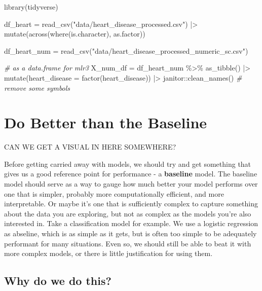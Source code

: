 \documentclass[
  letterpaper,
]{krantz}
\newenvironment{Shaded}{}{}
\newcommand{\AttributeTok}[1]{\textcolor[rgb]{0.49,0.56,0.16}{#1}}
\newcommand{\CommentTok}[1]{\textcolor[rgb]{0.38,0.63,0.69}{\textit{#1}}}
\newcommand{\FunctionTok}[1]{\textcolor[rgb]{0.02,0.16,0.49}{#1}}
\newcommand{\NormalTok}[1]{#1}
\newcommand{\OtherTok}[1]{\textcolor[rgb]{0.00,0.44,0.13}{#1}}
\newcommand{\SpecialCharTok}[1]{\textcolor[rgb]{0.25,0.44,0.63}{#1}}
\newcommand{\StringTok}[1]{\textcolor[rgb]{0.25,0.44,0.63}{#1}}
\begin{document}
\begin{Shaded}
\begin{Highlighting}[]
\FunctionTok{library}\NormalTok{(tidyverse)}

\NormalTok{df\_heart }\OtherTok{=} \FunctionTok{read\_csv}\NormalTok{(}\StringTok{"data/heart\_disease\_processed.csv"}\NormalTok{) }\SpecialCharTok{|\textgreater{}} 
    \FunctionTok{mutate}\NormalTok{(}\FunctionTok{across}\NormalTok{(}\FunctionTok{where}\NormalTok{(is.character), as.factor))}

\NormalTok{df\_heart\_num }\OtherTok{=} \FunctionTok{read\_csv}\NormalTok{(}\StringTok{"data/heart\_disease\_processed\_numeric\_sc.csv"}\NormalTok{)}


\CommentTok{\# as a data.frame for mlr3}
\NormalTok{X\_num\_df }\OtherTok{=}\NormalTok{ df\_heart\_num }\SpecialCharTok{\%\textgreater{}\%}
    \FunctionTok{as\_tibble}\NormalTok{() }\SpecialCharTok{|\textgreater{}} 
    \FunctionTok{mutate}\NormalTok{(}\AttributeTok{heart\_disease =} \FunctionTok{factor}\NormalTok{(heart\_disease)) }\SpecialCharTok{|\textgreater{}} 
\NormalTok{    janitor}\SpecialCharTok{::}\FunctionTok{clean\_names}\NormalTok{() }\CommentTok{\# remove some symbols}
\end{Highlighting}
\end{Shaded}

\section{Do Better than the Baseline}\label{do-better-than-the-baseline}

CAN WE GET A VISUAL IN HERE SOMEWHERE?

Before getting carried away with models, we should try and get something
that gives us a good reference point for performance - a
\textbf{baseline} model. The baseline model should serve as a way to
gauge how much better your model performs over one that is simpler,
probably more computationally efficient, and more interpretable. Or
maybe it's one that is sufficiently complex to capture something about
the data you are exploring, but not as complex as the models you're also
interested in. Take a classification model for example. We use a
logistic regression as abseline, which is as simple as it gets, but is
often too simple to be adequately performant for many situations. Even
so, we should still be able to beat it with more complex models, or
there is little justification for using them.

\subsection{Why do we do this?}\label{why-do-we-do-this}
\end{document}
